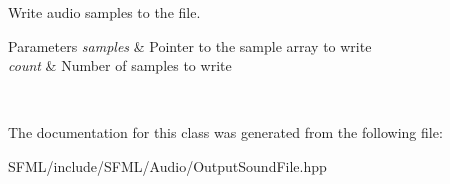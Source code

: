 Write audio samples to the file. 


\begin{DoxyParams}{Parameters}
{\em samples} & Pointer to the sample array to write \\
\hline
{\em count} & Number of samples to write \begin{DoxyVerb}\end{DoxyVerb}
 \\
\hline
\end{DoxyParams}


The documentation for this class was generated from the following file\+:\begin{DoxyCompactItemize}
\item 
S\+F\+M\+L/include/\+S\+F\+M\+L/\+Audio/Output\+Sound\+File.\+hpp\end{DoxyCompactItemize}
